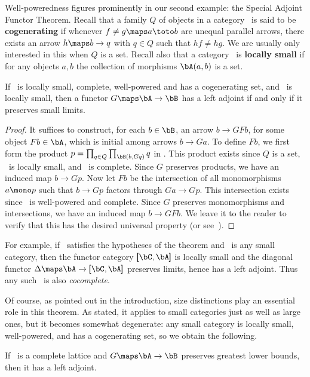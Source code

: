 \documentclass[12pt]{amsart}
\begin{document}
Well-poweredness figures prominently in our second example: the
Special Adjoint Functor Theorem.  Recall that a family $Q$ of objects
in a category \bA\ is said to be \textbf{cogenerating} if whenever
$f\neq g\maps a\toto b$ are unequal parallel arrows, there exists an
arrow $h\maps b\to q$ with $q\in Q$ such that $hf\neq hg$.  We are
usually only interested in this when $Q$ is a set.  Recall also that a
category \bA\ is \textbf{locally small} if for any objects $a,b$ the
collection of morphisms $\bA(a,b)$ is a set.

\begin{thm}
  If \bA\ is locally small, complete, well-powered and has a
  cogenerating set, and \bB\ is locally small, then a functor $G\maps
  \bA\to\bB$ has a left adjoint if and only if it preserves small
  limits.
\end{thm}
\begin{proof}
  It suffices to construct, for each $b\in \bB$, an arrow $b\to GFb$,
  for some object $Fb\in \bA$, which is initial among arrows $b\to
  Ga$.  To define $Fb$, we first form the product $p=\prod_{q\in
    Q}\prod_{\bB(b,Gq)} q$ in \bA.  This product exists since $Q$ is a
  set, \bB\ is locally small, and \bA\ is complete.  Since $G$
  preserves products, we have an induced map $b\to Gp$.  Now let $Fb$
  be the intersection of all monomorphisms $a\mono p$ such that $b\to
  Gp$ factors through $Ga\to Gp$.  This intersection exists since \bA\
  is well-powered and complete.  Since $G$ preserves monomorphisms and
  intersections, we have an induced map $b\to GFb$.  We leave it to
  the reader to verify that this has the desired universal property
  (or see~\cite[V.8]{maclane}).
\end{proof}

For example, if \bA\ satisfies the hypotheses of the theorem and \bC\
is any small category, then the functor category $\pmb[\bC,\bA\pmb]$
is locally small and the diagonal functor $\Delta\maps
\bA\to\pmb[\bC,\bA\pmb]$ preserves limits, hence has a left adjoint.
Thus any such \bA\ is also \emph{cocomplete}.

Of course, as pointed out in the introduction, size distinctions play
an essential role in this theorem.  As stated, it applies to small
categories just as well as large ones, but it becomes somewhat
degenerate: any small category is locally small, well-powered, and has
a cogenerating set, so we obtain the following.

\begin{cor}
  If \bA\ is a complete lattice and $G\maps \bA\to\bB$ preserves
  greatest lower bounds, then it has a left adjoint.
\end{cor}
\end{document}
